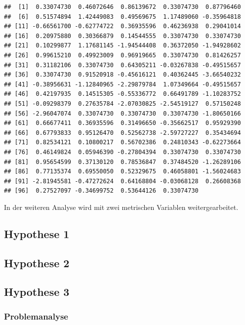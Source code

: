 \documentclass[]{article}
\begin{document}
\begin{verbatim}
##  [1]  0.33074730  0.46072646  0.86139672  0.33074730  0.87796460
##  [6]  0.51574894  1.42449083  0.49569675  1.17489060 -0.35964818
## [11] -0.66561700 -0.62774722  0.36935596  0.46236938  0.29041014
## [16]  0.20975880  0.30366879  0.14544555  0.33074730  0.33074730
## [21]  0.10299877  1.17681145 -1.94544408  0.36372050 -1.94928602
## [26]  0.99615210  0.49923009  0.96919665  0.33074730  0.81426257
## [31]  0.31182106  0.33074730  0.64305211 -0.03267838 -0.49515657
## [36]  0.33074730  0.91520918 -0.45616121  0.40362445 -3.66540232
## [41] -0.38956631 -1.12840965 -2.29879784  1.07349664 -0.49515657
## [46]  0.42197935  0.14515305 -0.55336772  0.66491789 -1.10283752
## [51] -0.09298379  0.27635784 -2.07030825 -2.54519127  0.57150248
## [56] -2.96047074  0.33074730  0.33074730  0.33074730 -1.80650166
## [61]  0.66677411  0.36935596  0.31496650 -0.35662517  0.95929390
## [66]  0.67793833  0.95126470  0.52562738 -2.59727227  0.35434694
## [71]  0.82534121  0.10800217  0.56702386  0.24810343 -0.62273664
## [76]  0.46149824  0.05946390 -0.27804394  0.33074730  0.33074730
## [81]  0.95654599  0.37130120  0.78536847  0.37484520 -1.26289106
## [86]  0.77135374  0.69550050  0.52329675  0.46058801 -1.56024683
## [91] -2.81945581 -0.47272624  0.64168804 -0.03068128  0.26608368
## [96]  0.27527097 -0.34699752  0.53644126  0.33074730
\end{verbatim}

In der weiteren Analyse wird mit zwei metrischen Variablen
weitergearbeitet.

\subsection{Hypothese 1}\label{hypothese-1}

\subsection{Hypothese 2}\label{hypothese-2}

\subsection{Hypothese 3}\label{hypothese-3}

\subsubsection{Problemanalyse}\label{problemanalyse}
\end{document}
